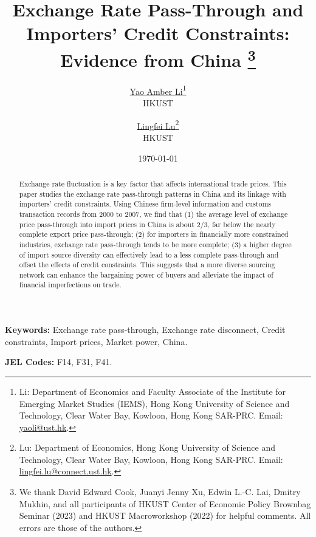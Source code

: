 \documentclass[12pt]{article}
\begin{document}
\title{  \Large \textbf{Exchange Rate Pass-Through and Importers' Credit Constraints: Evidence from China} 
\thanks{We thank David Edward Cook, Juanyi Jenny Xu, Edwin L.-C. Lai, Dmitry Mukhin, and all participants of HKUST Center of Economic Policy Brownbag Seminar (2023) and HKUST Macroworkshop (2022) for helpful comments. All errors are those of the authors.}}

\author{\large \href{http://yaoli.people.ust.hk/}{Yao Amber Li}\thanks{Li: Department of Economics and Faculty Associate of the Institute for Emerging Market Studies (IEMS), Hong Kong University of Science and Technology, Clear Water Bay, Kowloon, Hong Kong SAR-PRC. Email: \href{mailto:yaoli@ust.hk}{yaoli@ust.hk}.}\\ \large{HKUST}
\and \large \href{}{Lingfei Lu}\thanks{Lu: Department of Economics, Hong Kong University of Science and Technology, Clear Water Bay, Kowloon, Hong Kong SAR-PRC. Email: \href{mailto:}{lingfei.lu@connect.ust.hk}.} \\ \large{HKUST}
 }

\date{\today }

\maketitle

\begin{abstract}
Exchange rate fluctuation is a key factor that affects international trade prices. This paper studies the exchange rate pass-through patterns in China and its linkage with importers' credit constraints. Using Chinese firm-level information and customs transaction records from 2000 to 2007, we find that (1) the average level of exchange price pass-through into import prices in China is about 2/3, far below the nearly complete export price pass-through; (2) for importers in financially more constrained industries, exchange rate pass-through tends to be more complete; (3) a higher degree of import source diversity can effectively lead to a less complete pass-through and offset the effects of credit constraints. This suggests that a more diverse sourcing network can enhance the bargaining power of buyers and alleviate the impact of financial imperfections on trade.

\end{abstract}

\textbf{Keywords:} Exchange rate pass-through, Exchange rate disconnect, Credit constraints, Import prices, Market power, China.

\textbf{JEL Codes:} F14, F31, F41.
\end{document}
